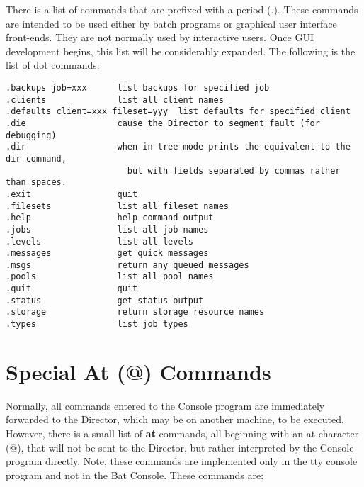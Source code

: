 There is a list of commands that are prefixed with a period (.). These
commands are intended to be used either by batch programs or graphical user
interface front-ends. They are not normally used by interactive users. Once
GUI development begins, this list will be considerably expanded. The following
is the list of dot commands: 

\footnotesize
\begin{verbatim}
.backups job=xxx      list backups for specified job
.clients              list all client names
.defaults client=xxx fileset=yyy  list defaults for specified client
.die                  cause the Director to segment fault (for debugging)
.dir                  when in tree mode prints the equivalent to the dir command,
                        but with fields separated by commas rather than spaces.
.exit                 quit
.filesets             list all fileset names
.help                 help command output
.jobs                 list all job names
.levels               list all levels
.messages             get quick messages
.msgs                 return any queued messages
.pools                list all pool names
.quit                 quit
.status               get status output
.storage              return storage resource names
.types                list job types
\end{verbatim}
\normalsize

\label{atcommands}

\section{Special At (@) Commands}

Normally, all commands entered to the Console program are immediately
forwarded to the Director, which may be on another machine, to be executed.
However, there is a small list of {\bf at} commands, all beginning with an at
character (@), that will not be sent to the Director, but rather interpreted
by the Console program directly. Note, these commands are implemented only in
the tty console program and not in the Bat Console. These commands are: 

